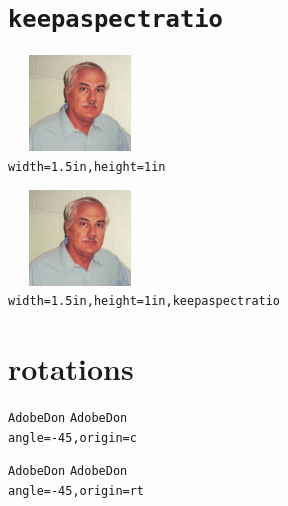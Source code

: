 \documentclass{article}
\begin{document}
\section{\protect\texttt{keepaspectratio}}

\begin{center}
\includegraphics[width=1.5in,height=1in]{graphics/AdobeDon}
\\[1ex]
\texttt{width=1.5in,height=1in}
\end{center}

\begin{center}
\includegraphics[width=1.5in,height=1in,keepaspectratio]{graphics/AdobeDon}
\\[1ex]
\texttt{width=1.5in,height=1in,keepaspectratio}
\end{center}


\section{rotations}

\begin{center}
\texttt{AdobeDon} 
\texttt{AdobeDon} \\[1ex]
\texttt{angle=-45,origin=c}
\end{center}

\begin{center}
\texttt{AdobeDon} 
\texttt{AdobeDon} \\[1ex]
\texttt{angle=-45,origin=rt}
\end{center}
\end{document}
